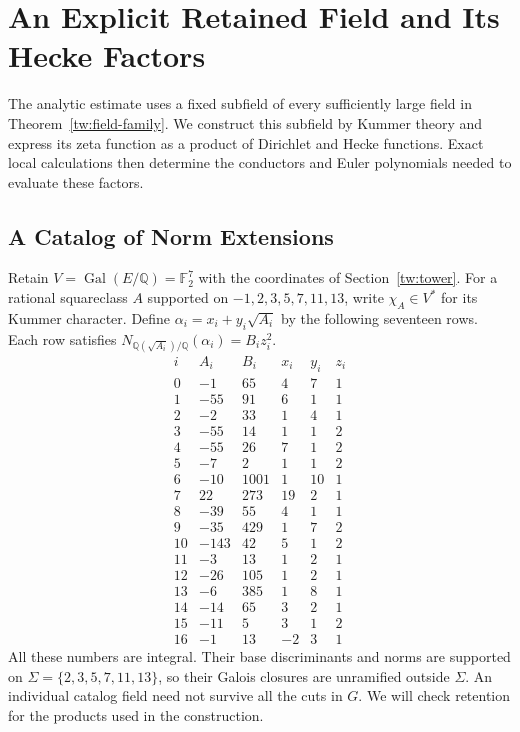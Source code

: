 \section{An Explicit Retained Field and Its Hecke Factors}\label{ar:field}
The analytic estimate uses a fixed subfield of every sufficiently large
field in Theorem~\ref{tw:field-family}. We construct this subfield by
Kummer theory and express its zeta function as a product of Dirichlet and
Hecke functions. Exact local calculations then determine the conductors
and Euler polynomials needed to evaluate these factors.

\subsection{A Catalog of Norm Extensions}\label{ar:catalog}
Retain $V=\operatorname{Gal}(E/\mathbb Q)=\mathbb F_2^7$ with the
coordinates of Section~\ref{tw:tower}. For a rational squareclass $A$
supported on $-1,2,3,5,7,11,13$, write $\chi_A\in V^*$ for its Kummer
character. Define $\alpha_i=x_i+y_i\sqrt{A_i}$ by the following seventeen rows.
Each row satisfies
$N_{\mathbb Q(\sqrt{A_i})/\mathbb Q}(\alpha_i)=B_i z_i^2$.
\begin{equation}\label{ar:norm-table}
\begin{array}{r|r|r|r|r|r}
 i&A_i&B_i&x_i&y_i&z_i\\\hline
0&-1&65&4&7&1\\
1&-55&91&6&1&1\\
2&-2&33&1&4&1\\
3&-55&14&1&1&2\\
4&-55&26&7&1&2\\
5&-7&2&1&1&2\\
6&-10&1001&1&10&1\\
7&22&273&19&2&1\\
8&-39&55&4&1&1\\
9&-35&429&1&7&2\\
10&-143&42&5&1&2\\
11&-3&13&1&2&1\\
12&-26&105&1&2&1\\
13&-6&385&1&8&1\\
14&-14&65&3&2&1\\
15&-11&5&3&1&2\\
16&-1&13&-2&3&1
\end{array}
\end{equation}
All these numbers are integral. Their base discriminants and norms are
supported on $\Sigma=\{2,3,5,7,11,13\}$, so their Galois closures are
unramified outside $\Sigma$. An individual catalog field need not survive
all the cuts in $G$. We will check retention for the products used in
the construction.


